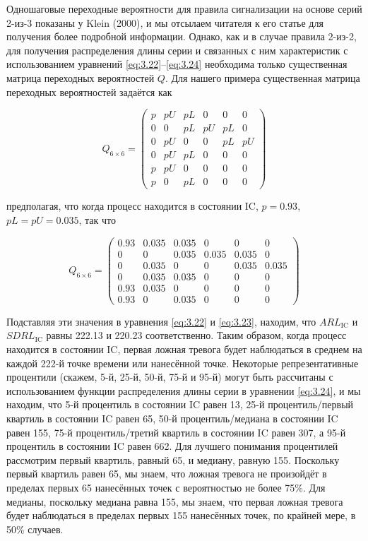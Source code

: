 Одношаговые переходные вероятности для правила сигнализации на основе серий 2-из-3 показаны у Klein (2000), и мы отсылаем читателя к его статье для получения более подробной информации. Однако, как и в случае правила 2-из-2, для получения распределения длины серии и связанных с ним характеристик с использованием уравнений \eqref{eq:3.22}–\eqref{eq:3.24} необходима только существенная матрица переходных вероятностей \(Q\). Для нашего примера существенная матрица переходных вероятностей задаётся как

\[
Q_{6 \times 6} = \begin{pmatrix}
p & pU & pL & 0 & 0 & 0 \\
0 & 0 & pL & pU & pL & 0 \\
0 & pU & 0 & 0 & pL & pU \\
0 & pU & pL & 0 & 0 & 0 \\
p & pU & 0 & 0 & 0 & 0 \\
p & 0 & pL & 0 & 0 & 0
\end{pmatrix}
\]

предполагая, что когда процесс находится в состоянии IC, \(p = 0.93\), \(pL = pU = 0.035\), так что

\[
Q_{6 \times 6} = \begin{pmatrix}
0.93 & 0.035 & 0.035 & 0 & 0 & 0 \\
0 & 0 & 0.035 & 0.035 & 0.035 & 0 \\
0 & 0.035 & 0 & 0 & 0.035 & 0.035 \\
0 & 0.035 & 0.035 & 0 & 0 & 0 \\
0.93 & 0.035 & 0 & 0 & 0 & 0 \\
0.93 & 0 & 0.035 & 0 & 0 & 0
\end{pmatrix}
\]

Подставляя эти значения в уравнения \eqref{eq:3.22} и \eqref{eq:3.23}, находим, что \(ARL_{\text{IC}}\) и \(SDRL_{\text{IC}}\) равны 222.13 и 220.23 соответственно. Таким образом, когда процесс находится в состоянии IC, первая ложная тревога будет наблюдаться в среднем на каждой 222-й точке времени или нанесённой точке. Некоторые репрезентативные процентили (скажем, 5-й, 25-й, 50-й, 75-й и 95-й) могут быть рассчитаны с использованием функции распределения длины серии в уравнении \eqref{eq:3.24}, и мы находим, что 5-й процентиль в состоянии IC равен 13, 25-й процентиль/первый квартиль в состоянии IC равен 65, 50-й процентиль/медиана в состоянии IC равен 155, 75-й процентиль/третий квартиль в состоянии IC равен 307, а 95-й процентиль в состоянии IC равен 662. Для лучшего понимания процентилей рассмотрим первый квартиль, равный 65, и медиану, равную 155. Поскольку первый квартиль равен 65, мы знаем, что ложная тревога не произойдёт в пределах первых 65 нанесённых точек с вероятностью не более 75\%. Для медианы, поскольку медиана равна 155, мы знаем, что первая ложная тревога будет наблюдаться в пределах первых 155 нанесённых точек, по крайней мере, в 50\% случаев.

